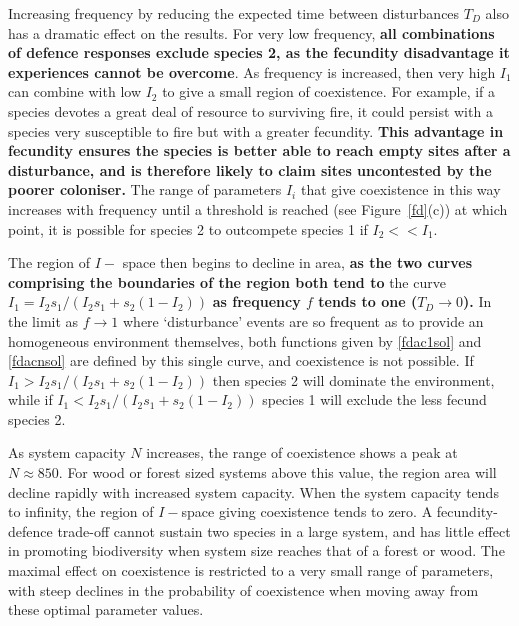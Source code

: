 \documentclass[preprint,10pt,reqno]{report}
\begin{document}
Increasing frequency by reducing the expected time between disturbances $T_D$ also has a dramatic effect on the results. For very low frequency, \textbf{all combinations of defence responses exclude species 2, as the fecundity disadvantage it experiences cannot be overcome}. As frequency is increased, then very high $I_1$ can combine with low $I_2$ to give a small region of coexistence. For example, if a species devotes a great deal of resource to surviving fire, it could persist with a species very susceptible to fire but with a greater fecundity. \textbf{This advantage in fecundity ensures the species is better able to reach empty sites after a disturbance, and is therefore likely to claim sites uncontested by the poorer coloniser.} The range of parameters $I_i$ that give coexistence in this way increases with frequency until a threshold is reached (see Figure~\ref{fd}(c)) at which point, it is possible for species 2 to outcompete species 1 if $I_2<<I_1$.

The region of $I-$ space then begins to decline in area, \textbf{as the two curves comprising the boundaries of the region both tend to} the curve $I_1=I_2s_1/(I_2s_1+s_2(1-I_2))$ \textbf{as frequency $f$ tends to one ($T_D \to 0$).} In the limit as $f \to 1$ where `disturbance' events are so frequent as to provide an homogeneous environment themselves, both functions given by \eqref{fdac1sol} and \eqref{fdacnsol} are defined by this single curve, and coexistence is not possible. If $I_1>I_2s_1/(I_2s_1+s_2(1-I_2))$ then species 2 will dominate the environment, while if $I_1<I_2s_1/(I_2s_1+s_2(1-I_2))$ species 1 will exclude the less fecund species 2.

As system capacity $N$ increases, the range of coexistence shows a peak at $N \approx 850$. For wood or forest sized systems above this value, the region area will decline rapidly with increased system capacity. When the system capacity tends to infinity, the region of $I-$space giving coexistence tends to zero. A fecundity-defence trade-off cannot sustain two species in a large system, and has little effect in promoting biodiversity when system size reaches that of a forest or wood. The maximal effect on coexistence is restricted to a very small range of parameters, with steep declines in the probability of coexistence when moving away from these optimal parameter values. 
\end{document}
